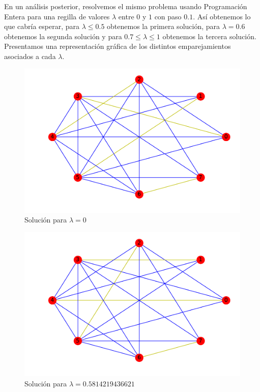 \documentclass[twoside,a4paper,openright,12pt,tikz]{book}
\begin{document}
En un análisis posterior, resolvemos el mismo problema usando Programación Entera para una regilla de valores $\lambda$ entre $0$ y $1$ con paso $0.1$. Así obtenemos lo que cabría esperar, para $\lambda \leq 0.5$ obtenemos la primera solución, para $\lambda = 0.6$ obtenemos la segunda solución y para $0.7 \leq \lambda \leq 1$ obtenemos la tercera solución. Presentamos una representación gráfica de los distintos emparejamientos asociados a cada $\lambda$. 
\begin{figure}[h!]
\centering
\includegraphics[scale=0.5]{opt2}
\caption{Solución para $\lambda=0$}
\end{figure}


\begin{figure}[h!]
\centering
\includegraphics[scale=0.5]{opt3}
\caption{Solución para $\lambda=0.5814219436621$}
\end{figure}
\end{document}
